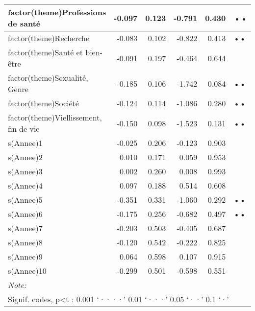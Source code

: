 \documentclass[
  letterpaper,
  DIV=11,
  numbers=noendperiod]{scrartcl}
\begin{document}
\begin{table}
\begin{minipage}[t]{\linewidth}
{\begin{tabular}[t]{l|r|r|r|r|l}
\hline
factor(theme)Professions de santé & -0.097 & 0.123 & -0.791 & 0.430 & ••\\
\hline
factor(theme)Recherche & -0.083 & 0.102 & -0.822 & 0.413 & ••\\
\hline
factor(theme)Santé et bien-être & -0.091 & 0.197 & -0.464 & 0.644 & \\
\hline
factor(theme)Sexualité, Genre & -0.185 & 0.106 & -1.742 & 0.084 & ••\\
\hline
factor(theme)Société & -0.124 & 0.114 & -1.086 & 0.280 & ••\\
\hline
factor(theme)Viellissement, fin de vie & -0.150 & 0.098 & -1.523 & 0.131 & ••\\
\hline
s(Annee)1 & -0.025 & 0.206 & -0.123 & 0.903 & \\
\hline
s(Annee)2 & 0.010 & 0.171 & 0.059 & 0.953 & \\
\hline
s(Annee)3 & 0.002 & 0.260 & 0.008 & 0.993 & \\
\hline
s(Annee)4 & 0.097 & 0.188 & 0.514 & 0.608 & \\
\hline
s(Annee)5 & -0.351 & 0.331 & -1.060 & 0.292 & ••\\
\hline
s(Annee)6 & -0.175 & 0.256 & -0.682 & 0.497 & ••\\
\hline
s(Annee)7 & -0.203 & 0.503 & -0.405 & 0.687 & \\
\hline
s(Annee)8 & -0.120 & 0.542 & -0.222 & 0.825 & \\
\hline
s(Annee)9 & 0.064 & 0.598 & 0.107 & 0.915 & \\
\hline
s(Annee)10 & -0.299 & 0.501 & -0.598 & 0.551 & \\
\hline
\multicolumn{6}{l}{\rule{0pt}{1em}\textit{Note: }}\\
\multicolumn{6}{l}{\rule{0pt}{1em}Signif. codes, p<t : 0.001 ‘····’ 0.01 ‘···’ 0.05 ‘··’ 0.1 ‘·’ }\\
\end{tabular}

}

\end{minipage}%

\end{table}
\end{document}
